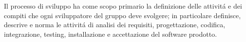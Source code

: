 Il processo di sviluppo ha come scopo primario la definizione delle attivit\'{a} e dei compiti che ogni sviluppatore del gruppo \Gruppo{} deve svolgere; in particolare definisce, descrive e norma le attivit\'{a} di analisi dei requisiti, progettazione, codifica, integrazione, testing, installazione e accettazione del software prodotto.